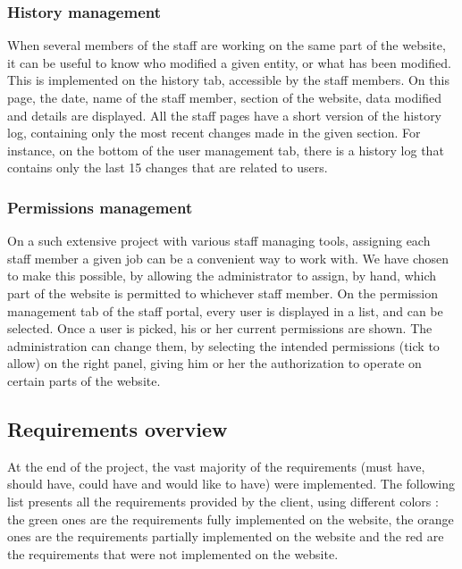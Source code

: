 \subsubsection{History management}
\label{subs:History management}


When several members of the staff are working on the same part of the website,
it can be useful to know who modified a given entity, or what has been modified.
This is implemented on the history tab, accessible by the staff members. On
this page, the date, name of the staff member, section of the website, data
modified and details are displayed. All the staff pages have a short version of
the history log, containing only the most recent changes made in the given
section. For instance, on the bottom of the user management tab, there is a
history log that contains only the last 15 changes that are related to users.

\subsubsection{Permissions management}
\label{subs:Permissions management}


On a such extensive project with various staff managing tools, assigning
each staff member a given job can be a convenient way to work with. We have
chosen to make this possible, by allowing the administrator to assign, by hand,
which part of the website is permitted to whichever staff member.
On the permission management tab of the staff portal, every user is displayed
in a list, and can be selected. Once a user is picked, his or her current
permissions are shown. The administration can change them, by selecting
the intended permissions (tick to allow) on the right panel,
giving him or her the authorization to operate on certain parts of the website.

\subsection{Requirements overview}
\label{Requirements overview}

At the end of the project, the vast majority of the requirements (must have, should have, could have and would like to have) were implemented. The following list presents all the requirements provided by the client, using different colors : the green ones are the requirements fully implemented on the website, the orange ones are the requirements partially implemented on the website and the red are the requirements that were not implemented on the website. \newline



